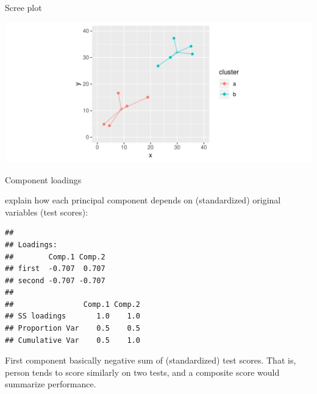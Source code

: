 \begin{frame}[fragile]{Scree plot}
  
\begin{knitrout}
\color{fgcolor}\begin{kframe}
\begin{alltt}
\end{alltt}
\end{kframe}
\includegraphics[width=\maxwidth]{figure/unnamed-chunk-5-1} 

\end{knitrout}
  
\end{frame}


\begin{frame}[fragile]{Component loadings}
  
  explain how each principal component depends on (standardized)
  original variables (test scores):
  
\begin{knitrout}
\color{fgcolor}\begin{kframe}
\begin{alltt}
\hlopt{$}
\end{alltt}
\begin{verbatim}
## 
## Loadings:
##        Comp.1 Comp.2
## first  -0.707  0.707
## second -0.707 -0.707
## 
##                Comp.1 Comp.2
## SS loadings       1.0    1.0
## Proportion Var    0.5    0.5
## Cumulative Var    0.5    1.0
\end{verbatim}
\end{kframe}
\end{knitrout}

First component basically negative sum of (standardized) test
scores. That is, person tends to score similarly on two tests, and a
composite score would summarize performance.
  
\end{frame}

